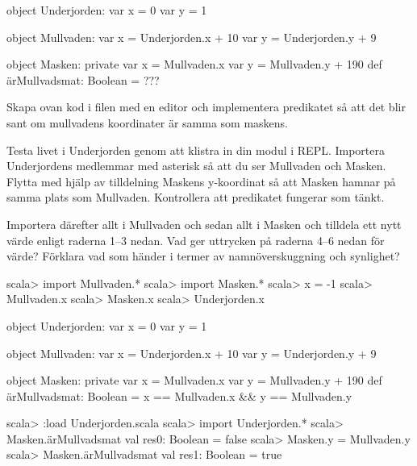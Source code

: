 \begin{Code}
object Underjorden:
  var x = 0
  var y = 1

  object Mullvaden:
    var x = Underjorden.x + 10
    var y = Underjorden.y + 9

  object Masken:
    private var x = Mullvaden.x
    var y = Mullvaden.y + 190
    def ärMullvadsmat: Boolean = ???
\end{Code}

\Subtask Skapa ovan kod i filen  med en editor och implementera predikatet   så att det blir sant om mullvadens koordinater är samma som maskens.

\Subtask Testa livet i Underjorden genom att klistra in din modul i REPL. Importera Underjordens medlemmar med asterisk så att du ser Mullvaden och Masken. Flytta med hjälp av tilldelning Maskens y-koordinat så att Masken hamnar på samma plats som Mullvaden. Kontrollera att predikatet  fungerar som tänkt.

 \Subtask Importera därefter allt i Mullvaden och sedan allt i Masken och tilldela  ett nytt värde enligt raderna 1--3 nedan. Vad ger uttrycken på raderna 4--6 nedan för värde? Förklara vad som händer i termer av namnöverskuggning och synlighet?

\begin{REPL}
scala> import Mullvaden.*
scala> import Masken.*
scala> x = -1
scala> Mullvaden.x
scala> Masken.x
scala> Underjorden.x
\end{REPL}

\SOLUTION

\TaskSolved \what

\SubtaskSolved

\begin{Code}
object Underjorden:
  var x = 0
  var y = 1

  object Mullvaden:
    var x = Underjorden.x + 10
    var y = Underjorden.y + 9

  object Masken:
    private var x = Mullvaden.x
    var y = Mullvaden.y + 190
    def ärMullvadsmat: Boolean = x == Mullvaden.x && y == Mullvaden.y
\end{Code}

\SubtaskSolved

\begin{REPL}
scala> :load Underjorden.scala
scala> import Underjorden.*
scala> Masken.ärMullvadsmat
val res0: Boolean = false
scala> Masken.y = Mullvaden.y
scala> Masken.ärMullvadsmat
val res1: Boolean = true
\end{REPL}


